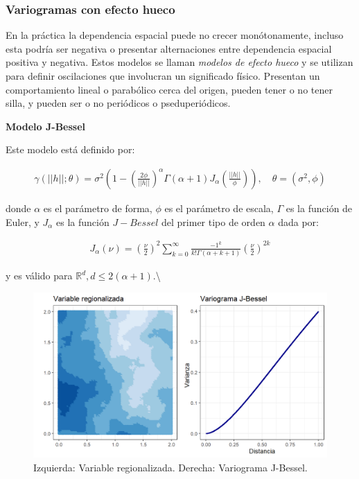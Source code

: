 \documentclass[
]{book}
\begin{document}
\hypertarget{variogramas-con-efecto-hueco}{%
\subsubsection*{Variogramas con efecto hueco}\label{variogramas-con-efecto-hueco}}

En la práctica la dependencia espacial puede no crecer monótonamente, incluso esta podría ser negativa o presentar alternaciones entre dependencia espacial positiva y negativa. Estos modelos se llaman \textit{modelos de efecto hueco} y se utilizan para definir oscilaciones que involucran un significado físico. Presentan un comportamiento lineal o parabólico cerca del origen, pueden tener o no tener silla, y pueden ser o no periódicos o pseduperiódicos.

\textbf{Modelo J-Bessel}

Este modelo está definido por:

\begin{align*}
    \gamma(||h||;\theta)=\sigma^2\left(1-\left(\frac{2\phi}{||h||} \right)^{\alpha} \Gamma(\alpha+1)J_\alpha \left(\frac{||h||}{\phi} \right) \right),\quad \theta=(\sigma^2,\phi)
\end{align*}

donde \(\alpha\) es el parámetro de forma, \(\phi\) es el parámetro de escala, \(\Gamma\) es la función de Euler, y \(J_\alpha\) es la función \(J-Bessel\) del primer tipo de orden \(\alpha\) dada por:

\begin{align*}
    J_\alpha (\nu) =\left(\frac{\nu}{2}\right)^2 \sum_{k=0}^\infty{{\frac{-1^k}{k!\Gamma(\alpha+k+1)}}{\left(\frac{\nu}{2}\right)^{2k}}}
\end{align*}

y es válido para \(\mathbb{R}^d, d\leq 2(\alpha+1)\).\textbackslash{}

\begin{figure}
\includegraphics[width=17.78in]{figuras/otros/bes_var} \caption{Izquierda: Variable regionalizada. Derecha: Variograma J-Bessel.}\label{fig:besvar}
\end{figure}
\end{document}
